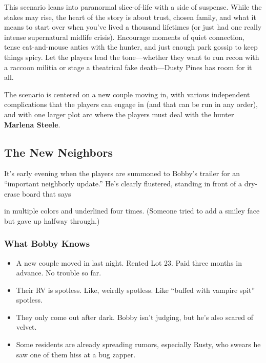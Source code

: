 This scenario leans into paranormal slice-of-life with a side of suspense. While the stakes may rise, the heart of the story is about trust, chosen family, and what it means to start over when you’ve lived a thousand lifetimes (or just had one really intense supernatural midlife crisis). Encourage moments of quiet connection, tense cat-and-mouse antics with the hunter, and just enough park gossip to keep things spicy. Let the players lead the tone—whether they want to run recon with a raccoon militia or stage a theatrical fake death—Dusty Pines has room for it all.

The scenario is centered on a new couple moving in, with various independent complications that the players can engage in (and that can be run in any order), and with one larger plot arc where the players must deal with the hunter \textbf{Marlena Steele}.

\subsection{The New Neighbors}

It’s early evening when the players are summoned to Bobby’s trailer for an “important neighborly update.” He’s clearly flustered, standing in front of a dry-erase board that says 
\begin{center}
\end{center}
in multiple colors and underlined four times. (Someone tried to add a smiley face but gave up halfway through.)

\subsubsection*{What Bobby Knows}
\begin{itemize}
    \item A new couple moved in last night. Rented Lot 23. Paid three months in advance. No trouble so far.
    \item Their RV is spotless. Like, weirdly spotless. Like “buffed with vampire spit” spotless.
    \item They only come out after dark. Bobby isn’t judging, but he’s also scared of velvet.
    \item Some residents are already spreading rumors, especially Rusty, who swears he saw one of them hiss at a bug zapper.
\end{itemize}

